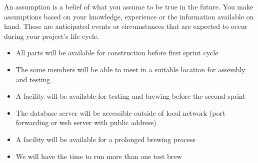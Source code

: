 An assumption is a belief of what you assume to be true in the future. You make assumptions based on your knowledge, experience or the information available on hand. These are anticipated events or circumstances that are expected to occur during your project's life cycle.



\begin{itemize}
  \item All parts will be available for construction before first sprint cycle 
  \item The some members will be able to meet in a suitable location for assembly and testing 
  \item A facility will be available for testing and brewing before the second sprint
  \item The database server will be accessible outside of local network (port forwarding or web server with public address) 
  \item A facility will be available for a prolonged brewing process
  \item We will have the time to run more than one test brew
\end{itemize}